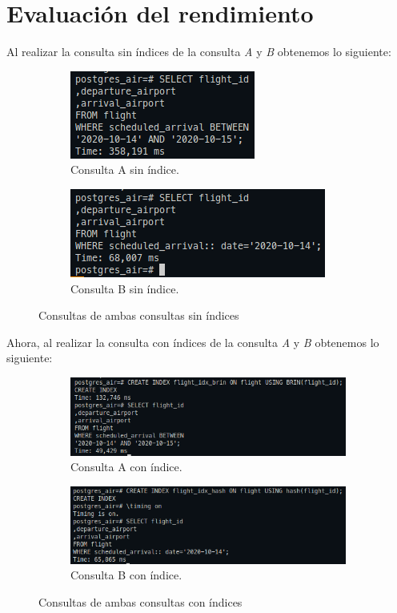 \documentclass[11pt]{report}
\begin{document}
\section{Evaluación del rendimiento}
Al realizar la consulta sin índices de la consulta \emph{A} y \emph{B} obtenemos lo siguiente:
\begin{figure}[H]
  \begin{subfigure}{0.5\textwidth}
    \centering
    \includegraphics[scale=0.7]{img/consulta_A_sin_indice.png}
    \caption{Consulta A sin índice.}
  \end{subfigure}%
  \begin{subfigure}{0.5\textwidth}
    \centering
    \includegraphics[scale=0.7]{img/consulta_b_sin_indice.png}
    \caption{Consulta B sin índice.}
  \end{subfigure}
  \caption{Consultas de ambas consultas sin índices}
\end{figure}

Ahora, al realizar la consulta con índices de la consulta \emph{A} y \emph{B} obtenemos lo siguiente:
\begin{figure}[H]
  \begin{subfigure}{0.5\textwidth}
    \centering
    \includegraphics[scale=0.45]{img/consulta_A_con_indice.png}
    \caption{Consulta A con índice.}
  \end{subfigure}%
  \begin{subfigure}{0.5\textwidth}
    \centering
    \includegraphics[scale=0.45]{img/consulta_b_con_indice.png}
    \caption{Consulta B con índice.}
  \end{subfigure}
  \caption{Consultas de ambas consultas con índices}
\end{figure}
\end{document}
